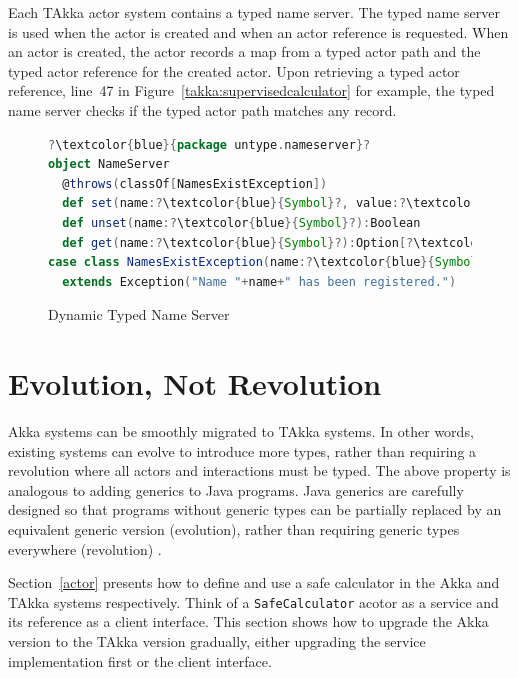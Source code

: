Each TAkka actor system contains a typed name server.  The typed name server is 
used when the actor is created and when an  actor reference is requested.  
When an actor is created, the actor records a map from a typed actor path and the
typed actor reference for the created actor.  Upon retrieving a typed actor
reference, line~47 in Figure~\ref {takka:supervisedcalculator} for example, the
typed name server checks if the typed actor path matches any record.


\begin{figure}[t]
\label{dynamic_name_server}
\begin{lstlisting}[language=scala, escapechar=?]
?\textcolor{blue}{package untype.nameserver}?
object NameServer 
  @throws(classOf[NamesExistException])
  def set(name:?\textcolor{blue}{Symbol}?, value:?\textcolor{blue}{Any}?):Boolean
  def unset(name:?\textcolor{blue}{Symbol}?):Boolean
  def get(name:?\textcolor{blue}{Symbol}?):Option[?\textcolor{blue}{Any}?]
case class NamesExistException(name:?\textcolor{blue}{Symbol}?)
  extends Exception("Name "+name+" has been registered.")  
\end{lstlisting}
\caption{Dynamic Typed Name Server}
\vspace{-10pt}
\end{figure}





\section{Evolution, Not Revolution}
\label{evolution}

Akka systems can be smoothly migrated to TAkka systems. In other words, 
existing systems can evolve to introduce more types, rather than requiring a 
revolution where all actors and interactions must be typed.
The above property is analogous to adding generics to Java programs.  Java 
generics are carefully designed so that programs without generic types can be 
partially replaced by an equivalent generic version (evolution), rather than 
requiring generic types everywhere (revolution) \cite{JGC}.

Section~\ref{actor} presents how to define and use a safe calculator
in the Akka and TAkka systems respectively.  Think of a {\tt SafeCalculator} acotor
as a service and its reference as a client interface.  This section shows how to upgrade
the Akka version to the TAkka version gradually, either upgrading the 
service implementation first or the client interface.


